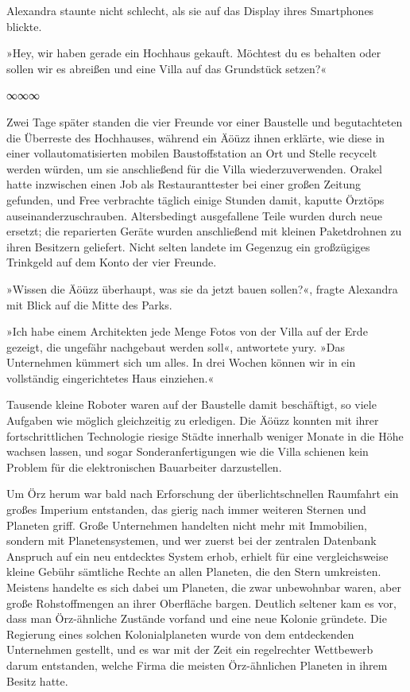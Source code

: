 Alexandra staunte nicht schlecht, als sie auf das Display ihres Smartphones blickte.

»Hey, wir haben gerade ein Hochhaus gekauft. Möchtest du es behalten oder sollen wir es abreißen und eine Villa auf das Grundstück setzen?«

\begin{center}
    ∞∞∞
\end{center}

Zwei Tage später standen die vier Freunde vor einer Baustelle und begutachteten die Überreste des Hochhauses, während ein Äöüzz ihnen erklärte, wie diese in einer vollautomatisierten mobilen Baustoffstation an Ort und Stelle recycelt werden würden, um sie anschließend für die Villa wiederzuverwenden. Orakel hatte inzwischen einen Job als Restauranttester bei einer großen Zeitung gefunden, und Free verbrachte täglich einige Stunden damit, kaputte Örztöps auseinanderzuschrauben. Altersbedingt ausgefallene Teile wurden durch neue ersetzt; die reparierten Geräte wurden anschließend mit kleinen Paketdrohnen zu ihren Besitzern geliefert. Nicht selten landete im Gegenzug ein großzügiges Trinkgeld auf dem Konto der vier Freunde.

»Wissen die Äöüzz überhaupt, was sie da jetzt bauen sollen?«, fragte Alexandra mit Blick auf die Mitte des Parks.

»Ich habe einem Architekten jede Menge Fotos von der Villa auf der Erde gezeigt, die ungefähr nachgebaut werden soll«, antwortete yury. »Das Unternehmen kümmert sich um alles. In drei Wochen können wir in ein vollständig eingerichtetes Haus einziehen.«

Tausende kleine Roboter waren auf der Baustelle damit beschäftigt, so viele Aufgaben wie möglich gleichzeitig zu erledigen. Die Äöüzz konnten mit ihrer fortschrittlichen Technologie riesige Städte innerhalb weniger Monate in die Höhe wachsen lassen, und sogar Sonderanfertigungen wie die Villa schienen kein Problem für die elektronischen Bauarbeiter darzustellen.

Um Örz herum war bald nach Erforschung der überlichtschnellen Raumfahrt ein großes Imperium entstanden, das gierig nach immer weiteren Sternen und Planeten griff. Große Unternehmen handelten nicht mehr mit Immobilien, sondern mit Planetensystemen, und wer zuerst bei der zentralen Datenbank Anspruch auf ein neu entdecktes System erhob, erhielt für eine vergleichsweise kleine Gebühr sämtliche Rechte an allen Planeten, die den Stern umkreisten. Meistens handelte es sich dabei um Planeten, die zwar unbewohnbar waren, aber große Rohstoffmengen an ihrer Oberfläche bargen. Deutlich seltener kam es vor, dass man Örz-ähnliche Zustände vorfand und eine neue Kolonie gründete. Die Regierung eines solchen Kolonialplaneten wurde von dem entdeckenden Unternehmen gestellt, und es war mit der Zeit ein regelrechter Wettbewerb darum entstanden, welche Firma die meisten Örz-ähnlichen Planeten in ihrem Besitz hatte.

